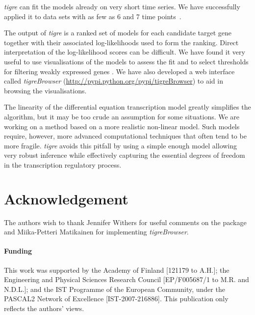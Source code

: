 \documentclass{bioinfo}
\newcommand{\tigre}{\emph{tigre}}
\begin{document}
\tigre{} can fit the models already on very short time series.  We
have successfully applied it to data sets with as few as 6 and 7 time
points~\citep{Honkela2010PNAS,Honkela2010MLSP}.

The output of \tigre{} is a ranked set of models for each candidate
target gene together with their associated log-likelihoods used to
form the ranking.  Direct interpretation of the log-likelihood scores
can be difficult.  We have found it very useful to use visualisations
of the models to assess the fit and to select thresholds for filtering
weakly expressed genes \citep[for details, see][]{Honkela2010PNAS}.
We have also developed a web interface called \emph{tigreBrowser}
(\href{http://pypi.python.org/pypi/tigreBrowser}{http://pypi.python.org/pypi/tigreBrowser}) to
aid in browsing the visualisations.

The linearity of the differential equation transcription model greatly
simplifies the algorithm, but it may be too crude an assumption for some
situations.  We are working on a method based on a more realistic
non-linear model.  Such models require, however, more advanced
computational techniques that often tend to be more fragile.
\tigre{} avoids this pitfall by using a simple enough model allowing
very robust inference while effectively capturing the
essential degrees of freedom in the transcription regulatory process.

\section*{Acknowledgement}

The authors wish to thank Jennifer Withers for useful comments on the
package and Miika-Petteri Matikainen for implementing \emph{tigreBrowser}.

\paragraph{Funding\textcolon}
This work was supported by the Academy of Finland [121179 to A.H.];
the Engineering and Physical Sciences Research Council [EP/F005687/1
to M.R. and N.D.L.]; and
the IST Programme of the European Community, under the PASCAL2
Network of Excellence [IST-2007-216886].
This publication only reflects the authors' views.

\small



\end{document}
